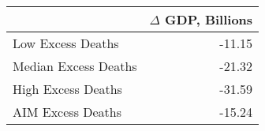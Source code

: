 \begin{tabular}{lr}
\toprule
 & $\Delta$ GDP, Billions \\
\midrule
Low Excess Deaths & -11.15 \\
Median Excess Deaths & -21.32 \\
High Excess Deaths & -31.59 \\
AIM Excess Deaths & -15.24 \\
\bottomrule
\end{tabular}
